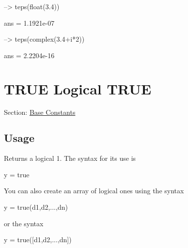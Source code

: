 \begin{DoxyVerbInclude}
--> teps(float(3.4))

ans = 
 1.1921e-07 

--> teps(complex(3.4+i*2))

ans = 
 2.2204e-16 
\end{DoxyVerbInclude}
 \hypertarget{constants_true}{}\section{T\-R\-U\-E Logical T\-R\-U\-E}\label{constants_true}
Section\-: \hyperlink{sec_constants}{Base Constants} \hypertarget{vtkwidgets_vtkxyplotwidget_Usage}{}\subsection{Usage}\label{vtkwidgets_vtkxyplotwidget_Usage}
Returns a logical 1. The syntax for its use is \begin{DoxyVerb}   y = true
\end{DoxyVerb}
 You can also create an array of logical ones using the syntax \begin{DoxyVerb}   y = true(d1,d2,...,dn)
\end{DoxyVerb}
 or the syntax \begin{DoxyVerb}   y = true([d1,d2,...,dn])
\end{DoxyVerb}
 